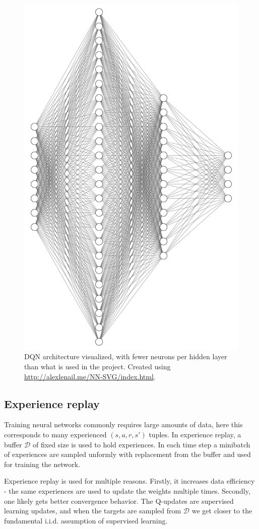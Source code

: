 \documentclass{article}
\begin{document}
\begin{figure}[tb]
  \centering
  \includegraphics[width=.6\linewidth]{images/architecture.png}
  \caption{DQN architecture visualized, with fewer neurons per hidden layer than what is used in the project. Created using \url{http://alexlenail.me/NN-SVG/index.html}.}
  \label{fig:archi}
\end{figure}

\subsection{Experience replay}
Training neural networks commonly requires large amounts of data, here this corresponds to many experienced $(s,a,r,s')$ tuples. In experience replay, a buffer $\mathcal{D}$ of fixed size is used to hold experiences. In each time step a minibatch of experiences are sampled unformly with replacement from the buffer and used for training the network.

Experience replay is used for multiple reasons. Firstly, it increases data efficiency - the same experiences are used to update the weights multiple times. Secondly, one likely gets better convergence behavior. The Q-updates are supervised learning updates, and when the targets are sampled from $\mathcal{D}$ we get closer to the fundamental i.i.d. assumption of supervised learning.
\end{document}
